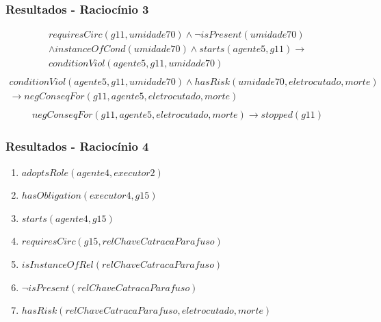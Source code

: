 \documentclass{beamer}
\begin{document}
\begin{frame}
	\frametitle{Resultados - Raciocínio 3}
	\begin{eqnarray}\nonumber
		requiresCirc(g11,umidade70) \wedge \neg isPresent(umidade70) \\ \nonumber
		\wedge instanceOfCond(umidade70) \wedge starts(agente5,g11)  \to \\ \nonumber   
		conditionViol(agente5,g11,umidade70) \nonumber \\	
	\end{eqnarray}
	\begin{eqnarray} \nonumber
		conditionViol(agente5,g11,umidade70) \wedge hasRisk(umidade70,eletrocutado,morte) \nonumber \\ 
		\to negConseqFor(g11,agente5,eletrocutado,morte) \nonumber \\ 	
	\end{eqnarray}
	\begin{eqnarray}
		negConseqFor(g11,agente5,eletrocutado,morte) \to stopped(g11)
	\end{eqnarray}

\end{frame}

\begin{frame}
	\frametitle{Resultados - Raciocínio 4}
	\begin{enumerate}
		\item $adoptsRole(agente4,executor2)$
		\item $hasObligation(executor4,g15)$	
		\item $starts(agente4,g15)$ 
		\item $requiresCirc(g15,relChaveCatracaParafuso)$
		\item $isInstanceOfRel(relChaveCatracaParafuso)$	
		\item $\neg isPresent(relChaveCatracaParafuso)$
		\item $hasRisk(relChaveCatracaParafuso,eletrocutado,morte)$
	\end{enumerate}
\end{frame}
\end{document}
